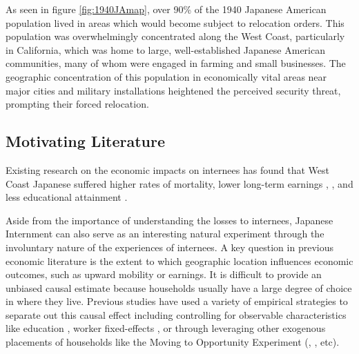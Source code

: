 \documentclass[12pt]{article}
\begin{document}
As seen in figure \ref{fig:1940JAmap}, over 90\% of the 1940 Japanese American
population lived in areas which would become subject to relocation orders.
This population was overwhelmingly concentrated along the West Coast, particularly in California,
which was home to large, well-established Japanese American communities,
many of whom were engaged in farming and small businesses.
The geographic concentration of this population in economically vital areas near major cities and military installations heightened the perceived security threat,
prompting their forced relocation.

\subsection{Motivating Literature}\label{motivation}

Existing research on the economic impacts on internees has found that
West Coast Japanese suffered higher rates of mortality, lower long-term earnings
\citep{chin_longrun_2005}, 
\citep{saavedra_early_2013},
and less educational attainment 
\citep{saavedra_school_2015}. 

Aside from the importance of understanding the losses to internees, Japanese
Internment can also serve as an interesting natural experiment through the
involuntary nature of the experiences of internees. 
A key question in previous economic literature is the extent to which 
geographic location influences economic outcomes, such as upward mobility or earnings.
It is difficult to provide an unbiased causal estimate because households usually
have a large degree of choice in where they live. Previous studies have used a
variety of empirical strategies to separate out this causal effect including
controlling for observable characteristics like education
\cite{glaeser_cities_2001}, worker fixed-effects \citep{card_location_2021}, or
through leveraging other exogenous placements of households like the Moving to
Opportunity Experiment (\cite{ludwig_long-term_2013},
\cite{chetty_effects_2016}, etc). 

% 
%   
\end{document}
